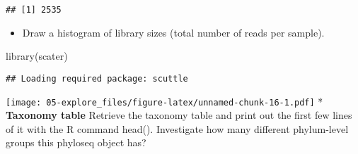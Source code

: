 \documentclass[
  oneside]{book}
\newenvironment{Shaded}{\begin{snugshade}}{\end{snugshade}}
\newcommand{\AttributeTok}[1]{\textcolor[rgb]{0.77,0.63,0.00}{#1}}
\newcommand{\CommentTok}[1]{\textcolor[rgb]{0.56,0.35,0.01}{\textit{#1}}}
\newcommand{\FunctionTok}[1]{\textcolor[rgb]{0.00,0.00,0.00}{#1}}
\newcommand{\NormalTok}[1]{#1}
\newcommand{\OtherTok}[1]{\textcolor[rgb]{0.56,0.35,0.01}{#1}}
\newcommand{\SpecialCharTok}[1]{\textcolor[rgb]{0.00,0.00,0.00}{#1}}
\newcommand{\StringTok}[1]{\textcolor[rgb]{0.31,0.60,0.02}{#1}}
\providecommand{\tightlist}{%
  \setlength{\itemsep}{0pt}\setlength{\parskip}{0pt}}
\begin{document}
\begin{Shaded}
\end{Shaded}

\begin{verbatim}
## [1] 2535
\end{verbatim}

\begin{itemize}
\tightlist
\item
  Draw a histogram of library sizes (total number of reads per
  sample).
\end{itemize}

\begin{Shaded}
\begin{Highlighting}[]
\FunctionTok{library}\NormalTok{(scater)}
\end{Highlighting}
\end{Shaded}

\begin{verbatim}
## Loading required package: scuttle
\end{verbatim}

\begin{Shaded}
\end{Shaded}

\texttt{[image: 05-explore\_files/figure-latex/unnamed-chunk-16-1.pdf]}
* \textbf{Taxonomy table} Retrieve the taxonomy table and print out the
first few lines of it with the R command head(). Investigate how
many different phylum-level groups this phyloseq object has?
\end{document}
